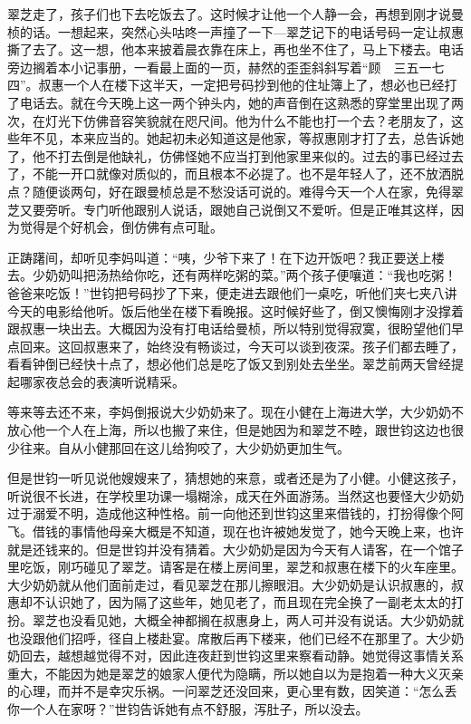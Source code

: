\par 翠芝走了，孩子们也下去吃饭去了。这时候才让他一个人静一会，再想到刚才说曼桢的话。一想起来，突然心头咕咚一声撞了一下—翠芝记下的电话号码一定让叔惠撕了去了。这一想，他本来披着晨衣靠在床上，再也坐不住了，马上下楼去。电话旁边搁着本小记事册，一看最上面的一页，赫然的歪歪斜斜写着“顾　三五一七四”。叔惠一个人在楼下这半天，一定把号码抄到他的住址簿上了，想必也已经打了电话去。就在今天晚上这一两个钟头内，她的声音倒在这熟悉的穿堂里出现了两次，在灯光下仿佛音容笑貌就在咫尺间。他为什么不能也打一个去？老朋友了，这些年不见，本来应当的。她起初未必知道这是他家，等叔惠刚才打了去，总告诉她了，他不打去倒是他缺礼，仿佛怪她不应当打到他家里来似的。过去的事已经过去了，不能一开口就像对质似的，而且根本不必提了。也不是年轻人了，还不放洒脱点？随便谈两句，好在跟曼桢总是不愁没话可说的。难得今天一个人在家，免得翠芝又要旁听。专门听他跟别人说话，跟她自己说倒又不爱听。但是正唯其这样，因为觉得是个好机会，倒仿佛有点可耻。
\par 正踌躇间，却听见李妈叫道：“咦，少爷下来了！在下边开饭吧？我正要送上楼去。少奶奶叫把汤热给你吃，还有两样吃粥的菜。”两个孩子便嚷道：“我也吃粥！爸爸来吃饭！”世钧把号码抄了下来，便走进去跟他们一桌吃，听他们夹七夹八讲今天的电影给他听。饭后他坐在楼下看晚报。这时候好些了，倒又懊悔刚才没撑着跟叔惠一块出去。大概因为没有打电话给曼桢，所以特别觉得寂寞，很盼望他们早点回来。这回叔惠来了，始终没有畅谈过，今天可以谈到夜深。孩子们都去睡了，看看钟倒已经快十点了，想必他们总是吃了饭又到别处去坐坐。翠芝前两天曾经提起哪家夜总会的表演听说精采。
\par 等来等去还不来，李妈倒报说大少奶奶来了。现在小健在上海进大学，大少奶奶不放心他一个人在上海，所以也搬了来住，但是她因为和翠芝不睦，跟世钧这边也很少往来。自从小健那回在这儿给狗咬了，大少奶奶更加生气。
\par 但是世钧一听见说他嫂嫂来了，猜想她的来意，或者还是为了小健。小健这孩子，听说很不长进，在学校里功课一塌糊涂，成天在外面游荡。当然这也要怪大少奶奶过于溺爱不明，造成他这种性格。前一向他还到世钧这里来借钱的，打扮得像个阿飞。借钱的事情他母亲大概是不知道，现在也许被她发觉了，她今天晚上来，也许就是还钱来的。但是世钧并没有猜着。大少奶奶是因为今天有人请客，在一个馆子里吃饭，刚巧碰见了翠芝。请客是在楼上房间里，翠芝和叔惠在楼下的火车座里。大少奶奶就从他们面前走过，看见翠芝在那儿擦眼泪。大少奶奶是认识叔惠的，叔惠却不认识她了，因为隔了这些年，她见老了，而且现在完全换了一副老太太的打扮。翠芝也没看见她，大概全神都搁在叔惠身上，两人可并没有说话。大少奶奶就也没跟他们招呼，径自上楼赴宴。席散后再下楼来，他们已经不在那里了。大少奶奶回去，越想越觉得不对，因此连夜赶到世钧这里来察看动静。她觉得这事情关系重大，不能因为她是翠芝的娘家人便代为隐瞒，所以她自以为是抱着一种大义灭亲的心理，而并不是幸灾乐祸。一问翠芝还没回来，更心里有数，因笑道：“怎么丢你一个人在家呀？”世钧告诉她有点不舒服，泻肚子，所以没去。
